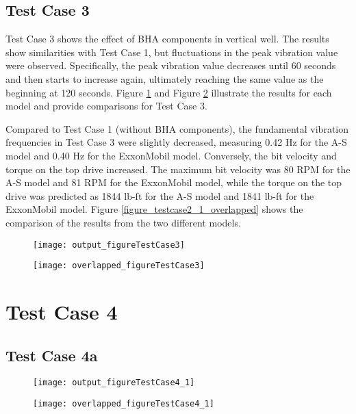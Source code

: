 \subsection{Test Case 3}
Test Case 3 shows the effect of BHA components in vertical well. The results show similarities with Test Case 1, but fluctuations in the peak vibration value were observed. Specifically, the peak vibration value decreases until 60 seconds and then starts to increase again, ultimately reaching the same value as the beginning at 120 seconds. Figure \ref{figure_testcase3} and Figure \ref{figure_testcase3_overlapped} illustrate the results for each model and provide comparisons for Test Case 3.

Compared to Test Case 1 (without BHA components), the fundamental vibration frequencies in Test Case 3 were slightly decreased, measuring 0.42 Hz for the A-S model and 0.40 Hz for the ExxonMobil model. Conversely, the bit velocity and torque on the top drive increased. The maximum bit velocity was 80 RPM for the A-S model and 81 RPM for the ExxonMobil model, while the torque on the top drive was predicted as 1844 lb-ft for the A-S model and 1841 lb-ft for the ExxonMobil model. Figure \ref{figure_testcase2_1_overlapped} shows the comparison of the results from the two different models.

\begin{figure}
  \centering
  \texttt{[image: output\_figureTestCase3]}
  \caption{}\label{figure_testcase3}
\end{figure}
\begin{figure}
  \centering
  \texttt{[image: overlapped\_figureTestCase3]}
  \caption{}\label{figure_testcase3_overlapped}
\end{figure}

\section{Test Case 4}
\subsection{Test Case 4a}
\begin{figure}
  \centering
  \texttt{[image: output\_figureTestCase4\_1]}
  \caption{}\label{figure_testcase4_1}
\end{figure}

\begin{figure}
  \centering
  \texttt{[image: overlapped\_figureTestCase4\_1]}
  \caption{}\label{figure_testcase4_1_overlapped}
\end{figure}

